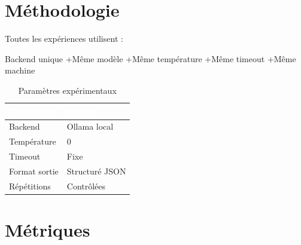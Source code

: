 \documentclass[12pt,a4paper]{article}
\begin{document}

\section{Méthodologie}

\begin{keypoint}

Toutes les expériences utilisent :

Backend unique \quad+\quad Même modèle \quad+\quad Même température \quad+\quad Même timeout \quad+\quad Même machine

\end{keypoint}


\begin{table}[H]

\centering

\begin{tabularx}{\linewidth}{lX}

\toprule

\rowcolor{primary}
\textcolor{white}{\textbf{Paramètre}} &
\textcolor{white}{\textbf{Valeur}} \\

\midrule

Backend & Ollama local \\

Température & 0 \\

Timeout & Fixe \\

Format sortie & Structuré JSON \\

Répétitions & Contrôlées \\

\bottomrule

\end{tabularx}

\caption{Paramètres expérimentaux}

\end{table}


\section{Métriques}
\end{document}
